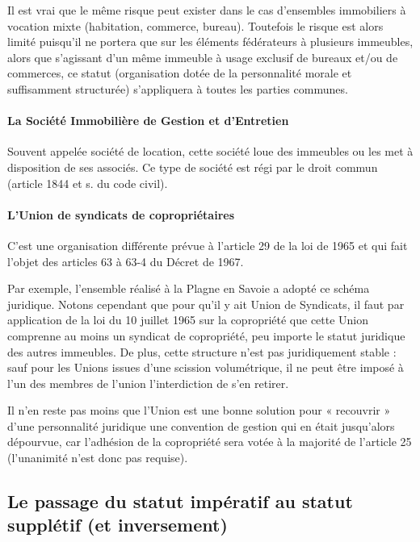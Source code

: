 			Il est vrai que le même risque peut exister dans le cas d’ensembles immobiliers à vocation mixte
			(habitation, commerce, bureau). Toutefois le risque est alors limité puisqu’il ne portera que sur les
			éléments fédérateurs à plusieurs immeubles, alors que s’agissant d’un même immeuble à usage exclusif
			de bureaux et/ou de commerces, ce statut (organisation dotée de la personnalité morale et suffisamment
			structurée) s’appliquera à toutes les parties communes.
		
		\paragraph{La Société Immobilière de Gestion et d'Entretien}
		
			Souvent appelée société de location, cette société loue des immeubles ou les met à disposition de ses
			associés. Ce type de société est régi par le droit commun (article 1844 et s. du code civil).
		
		\paragraph{L'Union de syndicats de copropriétaires}
		
			C’est une organisation différente prévue à l’article 29 de la loi de 1965 et qui fait l’objet des articles 63 à
			63-4 du Décret de 1967.
			
			Par exemple, l'ensemble réalisé à la Plagne en Savoie a adopté ce schéma juridique. Notons cependant que
			pour qu'il y ait Union de Syndicats, il faut par application de la loi du 10 juillet 1965 sur la copropriété que
			cette Union comprenne au moins un syndicat de copropriété, peu importe le statut juridique des autres
			immeubles. De plus, cette structure n’est pas juridiquement stable : sauf pour les Unions issues d’une
			scission volumétrique, il ne peut être imposé à l’un des membres de l’union l’interdiction de s’en retirer.
			
			Il n’en reste pas moins que l’Union est une bonne solution pour « recouvrir » d’une personnalité juridique
			une convention de gestion qui en était jusqu’alors dépourvue, car l’adhésion de la copropriété sera votée
			à la majorité de l’article 25 (l’unanimité n’est donc pas requise).
	
	\subsection{Le passage du statut impératif au statut supplétif (et inversement)}
	
